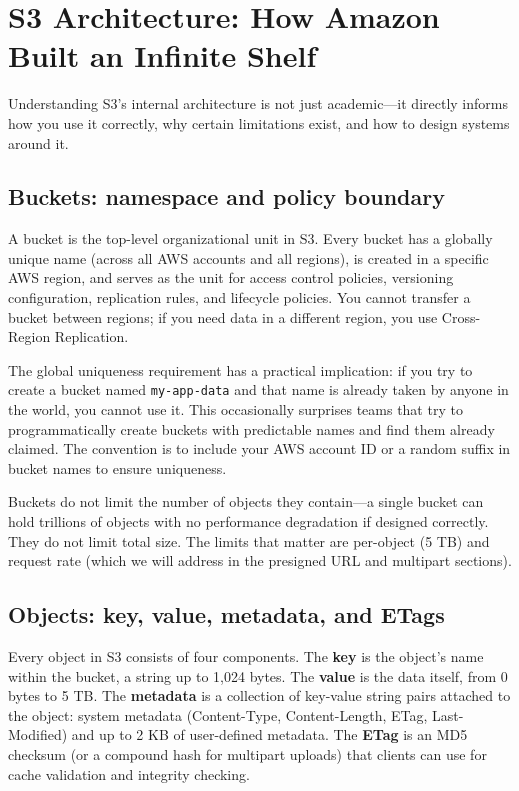 \documentclass[11pt,a4paper]{article}
\begin{document}
\section{S3 Architecture: How Amazon Built an Infinite Shelf}

Understanding S3's internal architecture is not just academic---it directly informs how you use it correctly, why certain limitations exist, and how to design systems around it.

\subsection{Buckets: namespace and policy boundary}

A bucket is the top-level organizational unit in S3. Every bucket has a globally unique name (across all AWS accounts and all regions), is created in a specific AWS region, and serves as the unit for access control policies, versioning configuration, replication rules, and lifecycle policies. You cannot transfer a bucket between regions; if you need data in a different region, you use Cross-Region Replication.

The global uniqueness requirement has a practical implication: if you try to create a bucket named \texttt{my-app-data} and that name is already taken by anyone in the world, you cannot use it. This occasionally surprises teams that try to programmatically create buckets with predictable names and find them already claimed. The convention is to include your AWS account ID or a random suffix in bucket names to ensure uniqueness.

Buckets do not limit the number of objects they contain---a single bucket can hold trillions of objects with no performance degradation if designed correctly. They do not limit total size. The limits that matter are per-object (5 TB) and request rate (which we will address in the presigned URL and multipart sections).

\subsection{Objects: key, value, metadata, and ETags}

Every object in S3 consists of four components. The \textbf{key} is the object's name within the bucket, a string up to 1,024 bytes. The \textbf{value} is the data itself, from 0 bytes to 5 TB. The \textbf{metadata} is a collection of key-value string pairs attached to the object: system metadata (Content-Type, Content-Length, ETag, Last-Modified) and up to 2 KB of user-defined metadata. The \textbf{ETag} is an MD5 checksum (or a compound hash for multipart uploads) that clients can use for cache validation and integrity checking.
\end{document}
